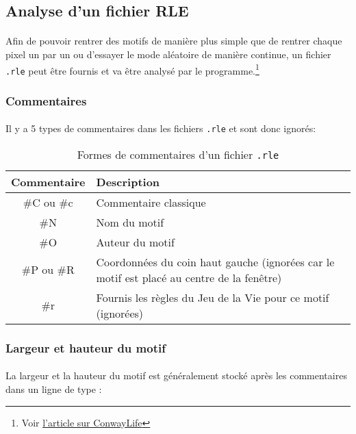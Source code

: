 \documentclass{report}
\begin{document}
\subsection{Analyse d'un fichier RLE}\label{ssec-rle}

\paragraph{} Afin de pouvoir rentrer des motifs de manière plus simple que de
rentrer chaque pixel un par un ou d'essayer le mode aléatoire de manière
continue, un fichier \texttt{.rle} peut être fournis et va être analysé par le
programme.\footnote{Voir
\href{http://conwaylife.com/wiki/Run_Length_Encoded}{l'article sur ConwayLife}}

\subsubsection{Commentaires}

\paragraph{} Il y a 5 types de commentaires dans les fichiers \texttt{.rle} et
sont donc ignorés:

\begin{table}[h]
	\centering
	\begin{tabular}{|c|p{10cm}|}
		\hline
		\textbf{Commentaire} & \textbf{Description}\\
		\hline
		\#C ou \#c & Commentaire classique\\
		\hline
		\#N & Nom du motif\\
		\hline
		\#O & Auteur du motif\\
		\hline
		\#P ou \#R & Coordonnées du coin haut gauche
					(ignorées car le motif est placé au centre de la fenêtre)\\
		\hline
		\#r & Fournis les règles du Jeu de la Vie pour ce motif (ignorées)\\
		\hline
	\end{tabular}
	\caption{Formes de commentaires d'un fichier \texttt{.rle}}
	\label{tab:rlecomments}
\end{table}

\subsubsection{Largeur et hauteur du motif}

\paragraph{} La largeur et la hauteur du motif est généralement stocké après
les commentaires dans un ligne de type :
\end{document}
